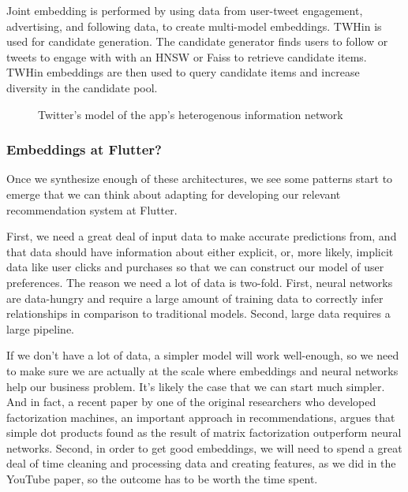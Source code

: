 \documentclass[11pt, table]{diazessay} %
\begin{document}
\begin{sloppypar}
Joint embedding is performed by using data from user-tweet engagement, advertising, and following data, to create multi-model embeddings. TWHin is used for candidate generation. The candidate generator finds users to follow or tweets to engage with with an HNSW or Faiss to retrieve candidate items. TWHin embeddings are then used to query candidate items and increase diversity in the candidate pool.

\begin{figure}[H]
\caption{Twitter's model of the app's heterogenous information network\citep{el2022twhin}}
\end{figure}


\subsubsection*{Embeddings at Flutter?}

Once we synthesize enough of these architectures, we see some patterns start to emerge that we can think about adapting for developing our relevant recommendation system at Flutter. 

First, we need a great deal of input data to make accurate predictions from, and that data should have information about either explicit, or, more likely, implicit data like user clicks and purchases so that we can construct our model of user preferences. The reason we need a lot of data is two-fold. First, neural networks are data-hungry and require a large amount of training data to correctly infer relationships in comparison to traditional models. Second, large data requires a large pipeline.  

If we don't have a lot of data, a simpler model will work well-enough, so we need to make sure we are actually at the scale where embeddings and neural networks help our business problem. It's likely the case that we can start much simpler. And in fact, a recent paper by one of the original researchers who developed factorization machines, an important approach in recommendations, argues that simple dot products found as the result of matrix factorization outperform neural networks\citep{rendle2020neural}.  Second, in order to get good embeddings, we will need to spend a great deal of time cleaning and processing data and creating features, as we did in the YouTube paper, so the outcome has to be worth the time spent. 


\end{sloppypar}
\end{document}

